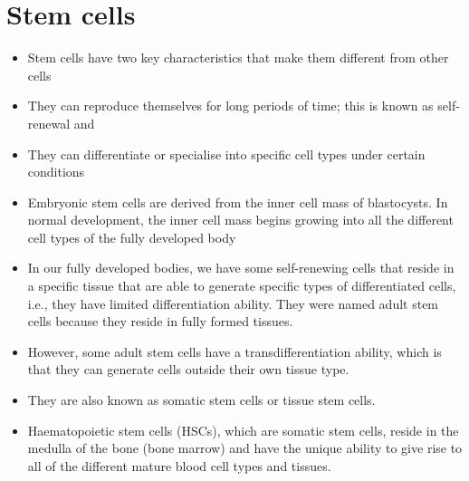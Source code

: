 \section{Stem cells}

\begin{itemize}
   \item Stem cells have two key characteristics that make them different from other cells
   \item They can reproduce themselves for long periods of time; this is known as self-renewal and
   \item They can differentiate or specialise into specific cell types under certain conditions
   \item Embryonic stem cells are derived from the inner cell mass of blastocysts. In normal development, the inner cell mass begins growing into all the different cell types of the fully developed body
   \item In our fully developed bodies, we have some self-renewing cells that reside in a specific tissue that are able to generate specific types of differentiated cells, i.e., they have limited differentiation ability. They were named adult stem cells because they reside in fully formed tissues.
   \item However, some adult stem cells have a transdifferentiation ability, which is that they can generate cells outside their own tissue type.
   \item They are also known as somatic stem cells or tissue stem cells.
   \item Haematopoietic stem cells (HSCs), which are somatic stem cells, reside in the medulla of the bone (bone marrow) and have the unique ability to give rise to all of the different mature blood cell types and tissues.
\end{itemize}
